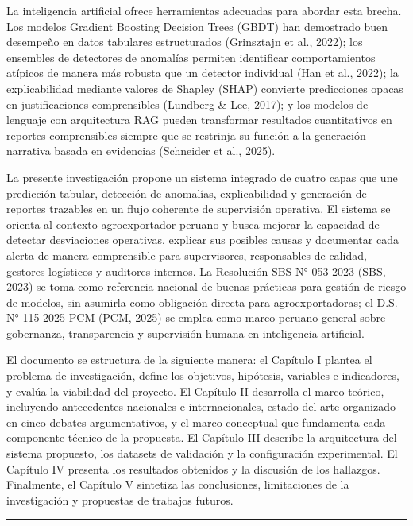 La inteligencia artificial ofrece herramientas adecuadas para abordar
esta brecha. Los modelos Gradient Boosting Decision Trees (GBDT) han
demostrado buen desempeño en datos tabulares estructurados (Grinsztajn
et al., 2022); los ensembles de detectores de anomalías permiten
identificar comportamientos atípicos de manera más robusta que un
detector individual (Han et al., 2022); la explicabilidad mediante
valores de Shapley (SHAP) convierte predicciones opacas en
justificaciones comprensibles (Lundberg \& Lee, 2017); y los modelos de
lenguaje con arquitectura RAG pueden transformar resultados
cuantitativos en reportes comprensibles siempre que se restrinja su
función a la generación narrativa basada en evidencias (Schneider et
al., 2025).

La presente investigación propone un sistema integrado de cuatro capas
que une predicción tabular, detección de anomalías, explicabilidad y
generación de reportes trazables en un flujo coherente de supervisión
operativa. El sistema se orienta al contexto agroexportador peruano y
busca mejorar la capacidad de detectar desviaciones operativas, explicar
sus posibles causas y documentar cada alerta de manera comprensible para
supervisores, responsables de calidad, gestores logísticos y auditores
internos. La Resolución SBS N° 053-2023 (SBS, 2023) se toma como
referencia nacional de buenas prácticas para gestión de riesgo de
modelos, sin asumirla como obligación directa para agroexportadoras; el
D.S. N° 115-2025-PCM (PCM, 2025) se emplea como marco peruano general
sobre gobernanza, transparencia y supervisión humana en inteligencia
artificial.

El documento se estructura de la siguiente manera: el Capítulo I plantea
el problema de investigación, define los objetivos, hipótesis, variables
e indicadores, y evalúa la viabilidad del proyecto. El Capítulo II
desarrolla el marco teórico, incluyendo antecedentes nacionales e
internacionales, estado del arte organizado en cinco debates
argumentativos, y el marco conceptual que fundamenta cada componente
técnico de la propuesta. El Capítulo III describe la arquitectura del
sistema propuesto, los datasets de validación y la configuración
experimental. El Capítulo IV presenta los resultados obtenidos y la
discusión de los hallazgos. Finalmente, el Capítulo V sintetiza las
conclusiones, limitaciones de la investigación y propuestas de trabajos
futuros.

\begin{center}\rule{0.5\linewidth}{0.5pt}\end{center}

